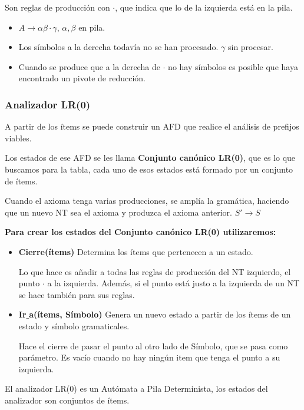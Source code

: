\documentclass[12pt, twoside, openright]{report} %
\begin{document}
Son reglas de producción con $\cdot$, que indica que lo de la izquierda está en la pila.
\begin{itemize}
	\item $A \rightarrow \alpha \beta \cdot \gamma$, $\alpha,\beta$ en pila.
	\item Los símbolos a la derecha todavía no se han procesado. $\gamma$ sin procesar.
	\item Cuando se produce que a la derecha de $\cdot$ no hay símbolos es posible que haya encontrado un pivote de reducción.
\end{itemize}

\subsubsection{Analizador LR(0)}
A partir de los ítems se puede construir un AFD que realice el análisis de prefijos viables.

Los estados de ese AFD se les llama \textbf{Conjunto canónico LR(0)}, que es lo que buscamos para la tabla, cada uno de esos estados está formado por un conjunto de ítems.

Cuando el axioma tenga varias producciones, se amplía la gramática, haciendo que un nuevo NT sea el axioma y produzca el axioma anterior. $S'\rightarrow S$

\textbf{Para crear los estados del Conjunto canónico LR(0) utilizaremos:}
\begin{itemize}
	\item \textbf{Cierre(ítems)} Determina los ítems que pertenecen a un estado.

	      Lo que hace es añadir a todas las reglas de producción del NT izquierdo, el punto $\cdot$ a la izquierda. Además, si el punto está justo a la izquierda de un NT se hace también para sus reglas.
	\item \textbf{Ir$\_$a(ítems, Símbolo)} Genera un nuevo estado a partir de los ítems de un estado y símbolo gramaticales.

	      Hace el cierre de pasar el punto al otro lado de Símbolo, que se pasa como parámetro. Es vacío cuando no hay ningún item que tenga el punto a su izquierda.
\end{itemize}

El analizador LR(0) es un Autómata a Pila Determinista, los estados del analizador son conjuntos de ítems.
\end{document}
